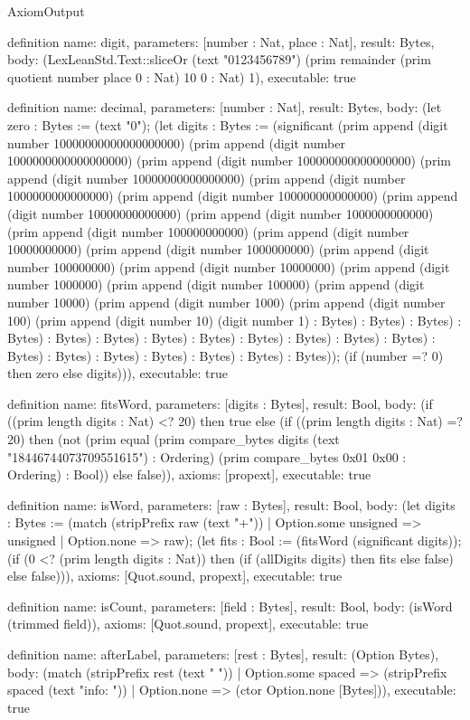 \begin{lexlean}{AxiomOutput}
\begin{semanticmodule}
definition{
  name: digit,
  parameters: [number : Nat, place : Nat],
  result: Bytes,
  body: (LexLeanStd.Text::sliceOr (text "0123456789") (prim remainder (prim quotient number place 0 : Nat) 10 0 : Nat) 1),
  executable: true
}

definition{
  name: decimal,
  parameters: [number : Nat],
  result: Bytes,
  body: (let zero : Bytes := (text "0"); (let digits : Bytes := (significant (prim append (digit number 10000000000000000000) (prim append (digit number 1000000000000000000) (prim append (digit number 100000000000000000) (prim append (digit number 10000000000000000) (prim append (digit number 1000000000000000) (prim append (digit number 100000000000000) (prim append (digit number 10000000000000) (prim append (digit number 1000000000000) (prim append (digit number 100000000000) (prim append (digit number 10000000000) (prim append (digit number 1000000000) (prim append (digit number 100000000) (prim append (digit number 10000000) (prim append (digit number 1000000) (prim append (digit number 100000) (prim append (digit number 10000) (prim append (digit number 1000) (prim append (digit number 100) (prim append (digit number 10) (digit number 1) : Bytes) : Bytes) : Bytes) : Bytes) : Bytes) : Bytes) : Bytes) : Bytes) : Bytes) : Bytes) : Bytes) : Bytes) : Bytes) : Bytes) : Bytes) : Bytes) : Bytes) : Bytes) : Bytes)); (if (number =? 0) then zero else digits))),
  executable: true
}

definition{
  name: fitsWord,
  parameters: [digits : Bytes],
  result: Bool,
  body: (if ((prim length digits : Nat) <? 20) then true else (if ((prim length digits : Nat) =? 20) then (not (prim equal (prim compare_bytes digits (text "18446744073709551615") : Ordering) (prim compare_bytes 0x01 0x00 : Ordering) : Bool)) else false)),
  axioms: [propext],
  executable: true
}

definition{
  name: isWord,
  parameters: [raw : Bytes],
  result: Bool,
  body: (let digits : Bytes := (match (stripPrefix raw (text "+"))
    | Option.some unsigned => unsigned
    | Option.none => raw); (let fits : Bool := (fitsWord (significant digits)); (if (0 <? (prim length digits : Nat)) then (if (allDigits digits) then fits else false) else false))),
  axioms: [Quot.sound, propext],
  executable: true
}

definition{
  name: isCount,
  parameters: [field : Bytes],
  result: Bool,
  body: (isWord (trimmed field)),
  axioms: [Quot.sound, propext],
  executable: true
}

definition{
  name: afterLabel,
  parameters: [rest : Bytes],
  result: (Option Bytes),
  body: (match (stripPrefix rest (text " "))
    | Option.some spaced => (stripPrefix spaced (text "info: "))
    | Option.none => (ctor Option.none [Bytes])),
  executable: true
}


\end{semanticmodule}
\end{lexlean}
